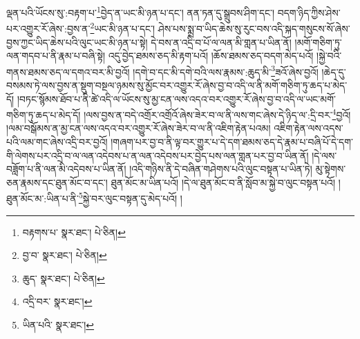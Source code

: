 ལྡན་པའི་ཡོངས་སུ་:བརྟག་པ་\footnote{བརྟགས་པ་  སྣར་ཐང་།  པེ་ཅིན། }བྱེད་ན་ཡང་མི་ཉན་པ་དང་། ནན་ཏན་དུ་སྒྲུབས་ཤིག་དང་། བདག་ཉིད་ཀྱིས་ཤེས་པར་འགྱུར་རོ་ཞེས་:བྱས་ན་\footnote{བྱ་བ་  སྣར་ཐང་།  པེ་ཅིན། }ཡང་མི་ཉན་པ་དང་། ཤེས་པས་སྨྲ་བ་ཡིད་ཆེས་སུ་རུང་བས་འདི་སྐད་གསུངས་སོ་ཞེས་བྱས་ཀྱང་ཡིད་ཆེས་པའི་ལུང་ཡང་མི་ཉན་པ་སྟེ། དེ་བས་ན་འདྲི་བ་པོ་ལ་ལན་མི་གླན་པ་ཡིན་ནོ། །མགོ་གཅིག་ཏུ་ལན་གདབ་པ་ནི་རྣམ་པ་བཞི་སྟེ། འདུ་བྱེད་ཐམས་ཅད་མི་རྟག་པའོ། །ཆོས་ཐམས་ཅད་བདག་མེད་པའོ། །སྐྱེ་བའི་གནས་ཐམས་ཅད་ལ་དགའ་བར་མི་བྱའོ། །དགེ་བ་དང་མི་དགེ་བའི་ལས་རྣམས་:ཆུད་མི་\footnote{ཆུད་  སྣར་ཐང་།  པེ་ཅིན། }ཟའོ་ཞེས་བྱའོ། །ཆེད་དུ་བསམས་ཏེ་ལས་བྱས་ན་སྡུག་བསྔལ་ཉམས་སུ་མྱོང་བར་འགྱུར་རོ་ཞེས་བྱ་བ་འདི་ལ་ནི་མགོ་གཅིག་ཏུ་ཆད་པ་མེད་དོ། །བཏང་སྙོམས་ཐོབ་པ་ནི་ཚེ་འདི་ལ་ཡོངས་སུ་མྱ་ངན་ལས་འདའ་བར་འགྱུར་རོ་ཞེས་བྱ་བ་འདི་ལ་ཡང་མགོ་གཅིག་ཏུ་ཆད་པ་མེད་དོ། །ལས་བྱས་ན་བདེ་འགྲོར་འགྲོའོ་ཞེས་ཟེར་བ་ལ་ནི་ལས་གང་ཞེས་དེ་ཉིད་ལ་:དྲི་བར་\footnote{འདྲི་བར་  སྣར་ཐང་། }བྱའོ། །ལམ་བསྒོམས་ན་མྱ་ངན་ལས་འདའ་བར་འགྱུར་རོ་ཞེས་ཟེར་བ་ལ་ནི་འཇིག་རྟེན་པའམ། འཇིག་རྟེན་ལས་འདས་པའི་ལམ་གང་ཞེས་འདྲི་བར་བྱའོ། །གཞག་པར་བྱ་བ་ནི་ལྟ་བར་གྱུར་པ་དེ་དག་ཐམས་ཅད་དེ་རྣམ་པ་བཞི་པོ་དེ་དག་གི་ལེགས་པར་འདྲི་བ་ལ་ལན་འདེབས་པ་ན་ལན་འདེབས་པར་བྱེད་པས་ལན་གླན་པར་བྱ་བ་ཡིན་ནོ། །དེ་ལས་བཟློག་པ་ནི་ལན་མི་འདེབས་པ་ཡིན་ནོ། །འདི་གཉིས་ནི་དེ་བཞིན་གཤེགས་པའི་ལུང་བསྟན་པ་ཡིན་ཏེ། མུ་སྟེགས་ཅན་རྣམས་དང་ཐུན་མོང་བ་དང་། ཐུན་མོང་མ་ཡིན་པའོ། །དེ་ལ་ཐུན་མོང་བ་ནི་སློབ་མ་སྐྱེ་བ་ལུང་བསྟན་པའོ། །ཐུན་མོང་མ་:ཡིན་པ་ནི་\footnote{ཡིན་པའི་  སྣར་ཐང་། }སྐྱེ་བར་ལུང་བསྟན་དུ་མེད་པའོ། །
